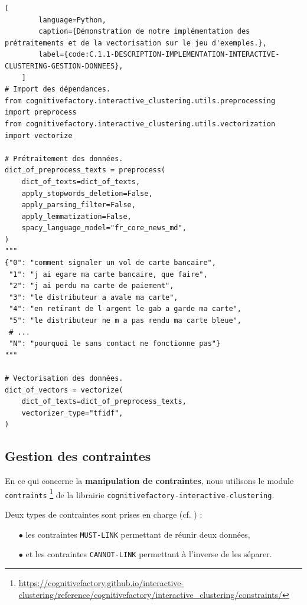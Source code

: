 	\begin{lstlisting}[
		language=Python,
		caption={Démonstration de notre implémentation des prétraitements et de la vectorisation sur le jeu d'exemples.},
		label={code:C.1.1-DESCRIPTION-IMPLEMENTATION-INTERACTIVE-CLUSTERING-GESTION-DONNEES},
	]
# Import des dépendances.
from cognitivefactory.interactive_clustering.utils.preprocessing import preprocess
from cognitivefactory.interactive_clustering.utils.vectorization import vectorize

# Prétraitement des données.
dict_of_preprocess_texts = preprocess(
	dict_of_texts=dict_of_texts,
	apply_stopwords_deletion=False,
	apply_parsing_filter=False,
	apply_lemmatization=False,
	spacy_language_model="fr_core_news_md",
)
"""
{"0": "comment signaler un vol de carte bancaire",
 "1": "j ai egare ma carte bancaire, que faire",
 "2": "j ai perdu ma carte de paiement",
 "3": "le distributeur a avale ma carte",
 "4": "en retirant de l argent le gab a garde ma carte",
 "5": "le distributeur ne m a pas rendu ma carte bleue",
 # ...
 "N": "pourquoi le sans contact ne fonctionne pas"}
"""

# Vectorisation des données.
dict_of_vectors = vectorize(
	dict_of_texts=dict_of_preprocess_texts,
	vectorizer_type="tfidf",
)
	\end{lstlisting}
	
	\subsection{Gestion des contraintes}
	\label{annex:C.1.2-DESCRIPTION-IMPLEMENTATION-INTERACTIVE-CLUSTERING-GESTION-DES-CONTRAINTES}
	
	En ce qui concerne la \textbf{manipulation de contraintes}, nous utilisons le module \texttt{contraints} \footnote{
		\url{https://cognitivefactory.github.io/interactive-clustering/reference/cognitivefactory/interactive_clustering/constraints/}
	} de la librairie \texttt{cognitivefactory-interactive-clustering}.
	
	Deux types de contraintes sont prises en charge (cf. \cite{wagstaff-cardie:2000:clustering-instancelevel-constraints}) :
	\begin{itemize}
		\item[\(\bullet\)] les contraintes \texttt{MUST-LINK} permettant de réunir deux données,
		\item[\(\bullet\)] et les contraintes \texttt{CANNOT-LINK} permettant à l'inverse de les séparer.
	\end{itemize}

